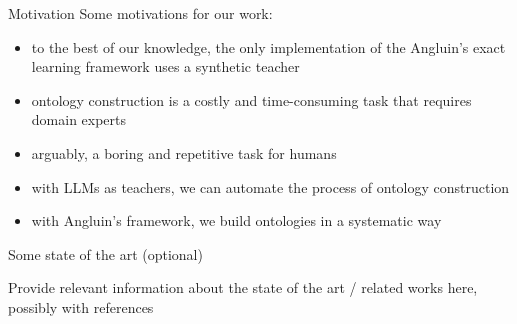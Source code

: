 \documentclass[handout]{beamer}\mode<handout>{\usetheme{AMSBolognaFC}}
\begin{document}
\begin{frame}[c]{Motivation}
    Some motivations for our work:
    \vfill
    \begin{itemize}
        \item to the best of our knowledge, the only implementation of the Angluin's exact learning framework uses a \alert{synthetic teacher} 
        \item ontology construction is a costly and time-consuming task that requires domain experts
        \item arguably, a boring and repetitive task for humans
        \item with LLMs as teachers, we can \alert{automate} the process of ontology construction
        \item with Angluin's framework, we build ontologies in a systematic way
    \end{itemize}
\end{frame}

\begin{frame}{Some state of the art (optional)}

    Provide relevant information about the state of the art / related works here, possibly with references

\end{frame}
\end{document}
